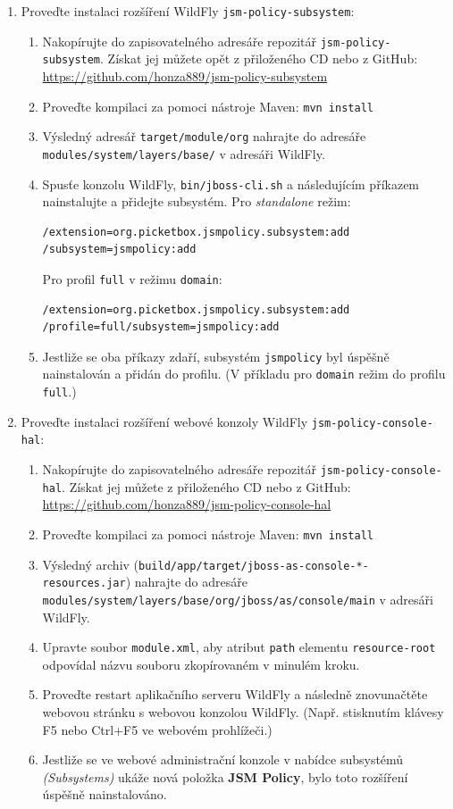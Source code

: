 \begin{enumerate}
  \item Proveďte instalaci rozšíření WildFly {\tt jsm-policy-subsystem}:
  \begin{enumerate}
    \item Nakopírujte do zapisovatelného adresáře repozitář {\tt jsm-policy-subsystem}. Získat jej můžete opět z přiloženého CD nebo z GitHub:
      \newline\url{https://github.com/honza889/jsm-policy-subsystem}
    \item Proveďte kompilaci za pomoci nástroje Maven: {\tt mvn install}
    \item Výsledný adresář {\tt target/module/org} nahrajte do adresáře {\tt modules/system/la\linebreak yers/base/} v adresáři WildFly.
    \item Spusťe konzolu WildFly, {\tt bin/jboss-cli.sh} a následujícím příkazem nainstalujte a přidejte subsystém. Pro {\it standalone} režim:
      \begin{lstlisting}
/extension=org.picketbox.jsmpolicy.subsystem:add
/subsystem=jsmpolicy:add
      \end{lstlisting}
      Pro profil {\tt full} v režimu {\tt domain}:
      \begin{lstlisting}
/extension=org.picketbox.jsmpolicy.subsystem:add
/profile=full/subsystem=jsmpolicy:add
      \end{lstlisting}
    \item Jestliže se oba příkazy zdaří, subsystém {\tt jsmpolicy} byl úspěšně nainstalován a přidán do profilu. (V příkladu pro {\tt domain} režim do profilu {\tt full}.)
  \end{enumerate}
  
  \item Proveďte instalaci rozšíření webové konzoly WildFly {\tt jsm-policy-console-hal}:
  \begin{enumerate}
    \item Nakopírujte do zapisovatelného adresáře repozitář {\tt jsm-policy-console-hal}. Získat jej můžete z přiloženého CD nebo z GitHub:
      \newline\url{https://github.com/honza889/jsm-policy-console-hal}
    \item Proveďte kompilaci za pomoci nástroje Maven: {\tt mvn install}
    \item Výsledný archiv ({\tt build/app/target/jboss-as-console-*-resources.jar}) nahrajte do adresáře {\tt modules/system/layers/base/org/jboss/as/console/main} v adresáři WildFly.
    \item Upravte soubor {\tt module.xml}, aby atribut {\tt path} elementu {\tt resource-root} odpovídal názvu souboru zkopírovaném v minulém kroku.
    \item Proveďte restart aplikačního serveru WildFly a následně znovunačtěte webovou stránku s webovou konzolou WildFly. (Např. stisknutím klávesy F5 nebo Ctrl+F5 ve webovém prohlížeči.)
    \item Jestliže se ve webové administrační konzole v nabídce subsystémů {\it (Subsystems)} ukáže nová položka {\bf JSM Policy}, bylo toto rozšíření úspěšně nainstalováno.
  \end{enumerate}
  

\end{enumerate}
